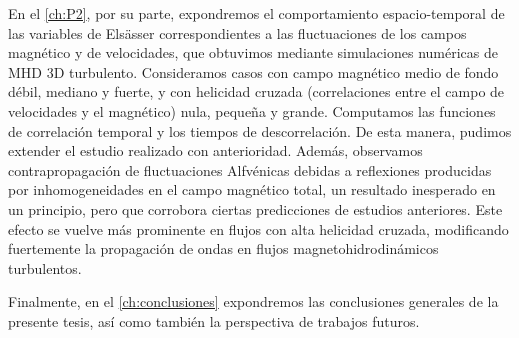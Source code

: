 En el \cref{ch:P2}, por su parte, expondremos el comportamiento
espacio-temporal de las variables de Els\"asser correspondientes a las
fluctuaciones de los campos magnético y de velocidades, que obtuvimos
mediante simulaciones numéricas de MHD 3D turbulento. Consideramos
casos con campo magnético medio de fondo débil, mediano y fuerte, y
con helicidad cruzada (correlaciones entre el campo de velocidades y
el magnético) nula, pequeña y grande.  Computamos las funciones de
correlación temporal y los tiempos de descorrelación. De esta manera,
pudimos extender el estudio realizado con anterioridad. Además,
observamos contrapropagación de fluctuaciones Alfvénicas debidas a
reflexiones producidas por inhomogeneidades en el campo magnético
total, un resultado inesperado en un principio, pero que corrobora
ciertas predicciones de estudios anteriores. Este efecto se vuelve más
prominente en flujos con alta helicidad cruzada, modificando
fuertemente la propagación de ondas en flujos magnetohidrodinámicos
turbulentos.


Finalmente, en el \cref{ch:conclusiones} expondremos las conclusiones
generales de la presente tesis, así como también la perspectiva de
trabajos futuros.
